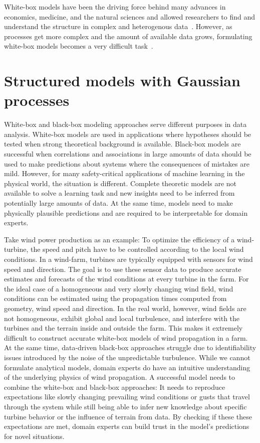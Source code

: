 White-box models have been the driving force behind many advances in economics, medicine, and the natural sciences and allowed researchers to find and understand the structure in complex and heterogenous data~\parencite{efron_modern_2005,giulio_d._agostini_bayesian_2003}.
However, as processes get more complex and the amount of available data grows, formulating white-box models becomes a very difficult task~\parencite{sutton_bitter_2019}.


\section{Structured models with Gaussian processes}
White-box and black-box modeling approaches serve different purposes in data analysis.
White-box models are used in applications where hypotheses should be tested when strong theoretical background is available.
Black-box models are successful when correlations and associations in large amounts of data should be used to make predictions about systems where the consequences of mistakes are mild.
However, for many safety-critical applications of machine learning in the physical world, the situation is different.
Complete theoretic models are not available to solve a learning task and new insights need to be inferred from potentially large amounts of data.
At the same time, models need to make physically plausible predictions and are required to be interpretable for domain experts.

Take wind power production as an example:
To optimize the efficiency of a wind-turbine, the speed and pitch have to be controlled according to the local wind conditions.
In a wind-farm, turbines are typically equipped with sensors for wind speed and direction.
The goal is to use these sensor data to produce accurate estimates and forecasts of the wind conditions at every turbine in the farm.
For the ideal case of a homogeneous and very slowly changing wind field, wind conditions can be estimated using the propagation times computed from geometry, wind speed and direction.
In the real world, however, wind fields are not homogeneous, exhibit global and local turbulence, and interfere with the turbines and the terrain inside and outside the farm.
This makes it extremely difficult to construct accurate white-box models of wind propagation in a farm.
At the same time, data-driven black-box approaches struggle due to identifiability issues introduced by the noise of the unpredictable turbulence.
While we cannot formulate analytical models, domain experts do have an intuitive understanding of the underlying physics of wind propagation.
A successful model needs to combine the white-box and black-box approaches:
It needs to reproduce expectations like slowly changing prevailing wind conditions or gusts that travel through the system while still being able to infer new knowledge about specific turbine behavior or the influence of terrain from data.
By checking if these these expectations are met, domain experts can build trust in the model's predictions for novel situations.

